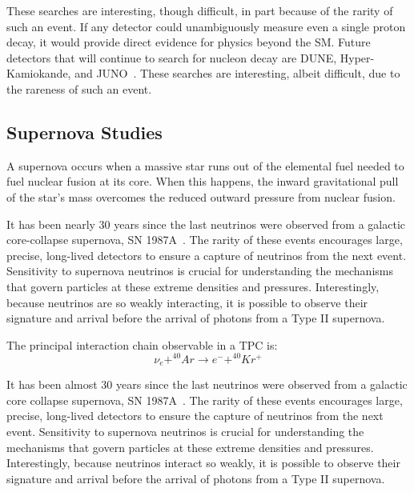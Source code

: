 These searches are interesting, though difficult, in part because of the rarity of such an event.
If any detector could unambiguously measure even a single proton decay, it would provide direct evidence for physics beyond the SM.
Future detectors that will continue to search for nucleon decay are DUNE, Hyper-Kamiokande, and JUNO~\citep{DUNE_TDR_V1_Abi_2020, https://doi.org/10.48550/arxiv.1805.04163, Juno:2022103927}.
These searches are interesting, albeit difficult, due to the rareness of such an event.

\subsection{Supernova Studies}
\label{sec:intro_supernova}
A supernova occurs when a massive star runs out of the elemental fuel needed to fuel nuclear fusion at its core.
When this happens, the inward gravitational pull of the star's mass overcomes the reduced outward pressure from nuclear fusion.

It has been nearly 30 years since the last neutrinos were observed from a galactic core-collapse supernova, SN 1987A~\citep{1987ApJ...322..795F}.
The rarity of these events encourages large, precise, long-lived detectors to ensure a capture of neutrinos from the next event.
Sensitivity to supernova neutrinos is crucial for understanding the mechanisms that govern particles at these extreme densities and pressures.
Interestingly, because neutrinos are so weakly interacting, it is possible to observe their signature and arrival before the arrival of photons from a Type II supernova.


The principal interaction chain observable in a TPC is:
\begin{equation}
    \nu_{e} + ^{40}Ar \rightarrow e^- + ^{40}Kr^{+}
\end{equation}

It has been almost 30 years since the last neutrinos were observed from a galactic core collapse supernova, SN 1987A~\citep{1987ApJ...322..795F}.
The rarity of these events encourages large, precise, long-lived detectors to ensure the capture of neutrinos from the next event.
Sensitivity to supernova neutrinos is crucial for understanding the mechanisms that govern particles at these extreme densities and pressures.
Interestingly, because neutrinos interact so weakly, it is possible to observe their signature and arrival before the arrival of photons from a Type II supernova.

